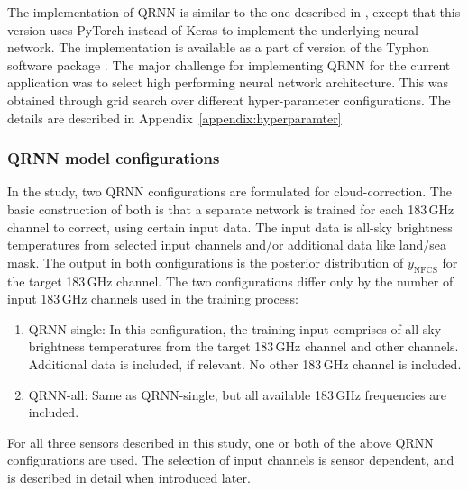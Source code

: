 \documentclass[amt, manuscript]{copernicus}
\newcommand{\ynfcs}{y_\text{NFCS}}
\begin{document}
The implementation of QRNN is similar to the one described in
\citet{pfreundschuh:aneur:18}, except that this version uses PyTorch
\citep{paszke2017automatic} instead of Keras \citep{chollet2015keras} to
implement the underlying neural network. The implementation is available as a
part of version of the Typhon software package \citep{typhonv08}. The major
challenge for implementing QRNN for the current application was to select high
performing neural network architecture. This was obtained through grid search
over different hyper-parameter configurations. The details are described in
Appendix~\ref{appendix:hyperparamter}

\subsubsection{QRNN model configurations}
%
\label{sec:QRNN_configuration}
In the study, two QRNN configurations are formulated for cloud-correction. The
basic construction of both is that a separate network is trained for each
183\,GHz channel to correct, using certain input data. The input data is all-sky brightness temperatures from selected input channels and/or additional data like land/sea mask. The
output in both configurations is the posterior distribution of $\ynfcs$ for
the target 183\,GHz channel. The two configurations differ only by the number of
input 183\,GHz channels used in the training process:

\begin{enumerate}
	\item QRNN-single: In this configuration, the training input comprises of  all-sky brightness temperatures from the target 183\,GHz channel and other channels. Additional data is included, if relevant. No other 183\,GHz channel is included.  
	
	\item QRNN-all: Same as QRNN-single, but all available 183\,GHz frequencies are included.      
\end{enumerate}

For all three sensors described in this study, one or both of the above QRNN configurations are used. The selection of input channels is sensor dependent, and is described in detail when introduced later.  
\end{document}
